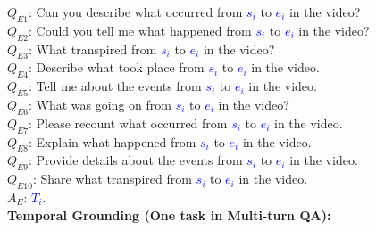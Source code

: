 \documentclass[10pt,twocolumn,letterpaper]{article}
\begin{document}
\begin{figure*}[t]
\begin{tcolorbox}[colback=gray!20, colframe=black, text width=0.9\textwidth, title={Box 3: Templates to transform events $\{s_i, e_i, T_i\}$ into QA dialogues, 10 templates for each task.}]
$Q_{E1}$: Can you describe what occurred from \textcolor{blue}{$s_i$} to \textcolor{blue}{$e_i$} in the video? \\ 
$Q_{E2}$: Could you tell me what happened from \textcolor{blue}{$s_i$} to \textcolor{blue}{$e_i$} in the video? \\ 
$Q_{E3}$: What transpired from \textcolor{blue}{$s_i$} to \textcolor{blue}{$e_i$} in the video? \\ 
$Q_{E4}$: Describe what took place from \textcolor{blue}{$s_i$} to \textcolor{blue}{$e_i$} in the video. \\ 
$Q_{E5}$: Tell me about the events from \textcolor{blue}{$s_i$} to \textcolor{blue}{$e_i$} in the video. \\ 
$Q_{E6}$: What was going on from \textcolor{blue}{$s_i$} to \textcolor{blue}{$e_i$} in the video? \\ 
$Q_{E7}$: Please recount what occurred from \textcolor{blue}{$s_i$} to \textcolor{blue}{$e_i$} in the video. \\ 
$Q_{E8}$: Explain what happened from \textcolor{blue}{$s_i$} to \textcolor{blue}{$e_i$} in the video. \\ 
$Q_{E9}$: Provide details about the events from \textcolor{blue}{$s_i$} to \textcolor{blue}{$e_i$} in the video. \\ 
$Q_{E10}$: Share what transpired from \textcolor{blue}{$s_i$} to \textcolor{blue}{$e_i$} in the video. \\
$A_{E}$: \textcolor{blue}{$T_i$}. \\

\textbf{Temporal Grounding (One task in Multi-turn QA):}


\end{tcolorbox}
\end{figure*}
\end{document}
